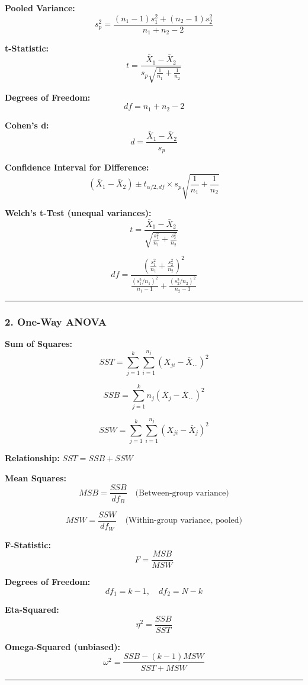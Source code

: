 \documentclass[11pt]{article}
\begin{document}
\textbf{Pooled Variance:}
\[s_p^2 = \frac{(n_1-1)s_1^2 + (n_2-1)s_2^2}{n_1 + n_2 - 2}\]

\textbf{t-Statistic:}
\[t = \frac{\bar{X}_1 - \bar{X}_2}{s_p\sqrt{\frac{1}{n_1} + \frac{1}{n_2}}}\]

\textbf{Degrees of Freedom:} \[df = n_1 + n_2 - 2\]

\textbf{Cohen's d:} \[d = \frac{\bar{X}_1 - \bar{X}_2}{s_p}\]

\textbf{Confidence Interval for Difference:}
\[(\bar{X}_1 - \bar{X}_2) \pm t_{\alpha/2, df} \times s_p\sqrt{\frac{1}{n_1} + \frac{1}{n_2}}\]

\textbf{Welch's t-Test (unequal variances):}
\[t = \frac{\bar{X}_1 - \bar{X}_2}{\sqrt{\frac{s_1^2}{n_1} + \frac{s_2^2}{n_2}}}\]

\[df = \frac{\left(\frac{s_1^2}{n_1} + \frac{s_2^2}{n_2}\right)^2}{\frac{(s_1^2/n_1)^2}{n_1-1} + \frac{(s_2^2/n_2)^2}{n_2-1}}\]

\begin{center}\rule{0.5\linewidth}{0.5pt}\end{center}

\subsubsection{\texorpdfstring{\textbf{2. One-Way
ANOVA}}{2. One-Way ANOVA}}\label{one-way-anova}

\textbf{Sum of Squares:}
\[SST = \sum_{j=1}^{k}\sum_{i=1}^{n_j}(X_{ji} - \bar{X}_{\cdot\cdot})^2\]

\[SSB = \sum_{j=1}^{k} n_j(\bar{X}_j - \bar{X}_{\cdot\cdot})^2\]

\[SSW = \sum_{j=1}^{k}\sum_{i=1}^{n_j}(X_{ji} - \bar{X}_j)^2\]

\textbf{Relationship:} \(SST = SSB + SSW\)

\textbf{Mean Squares:}
\[MSB = \frac{SSB}{df_B} \quad \text{(Between-group variance)}\]

\[MSW = \frac{SSW}{df_W} \quad \text{(Within-group variance, pooled)}\]

\textbf{F-Statistic:} \[F = \frac{MSB}{MSW}\]

\textbf{Degrees of Freedom:} \[df_1 = k-1, \quad df_2 = N-k\]

\textbf{Eta-Squared:} \[\eta^2 = \frac{SSB}{SST}\]

\textbf{Omega-Squared (unbiased):}
\[\omega^2 = \frac{SSB - (k-1)MSW}{SST + MSW}\]

\begin{center}\rule{0.5\linewidth}{0.5pt}\end{center}
\end{document}
